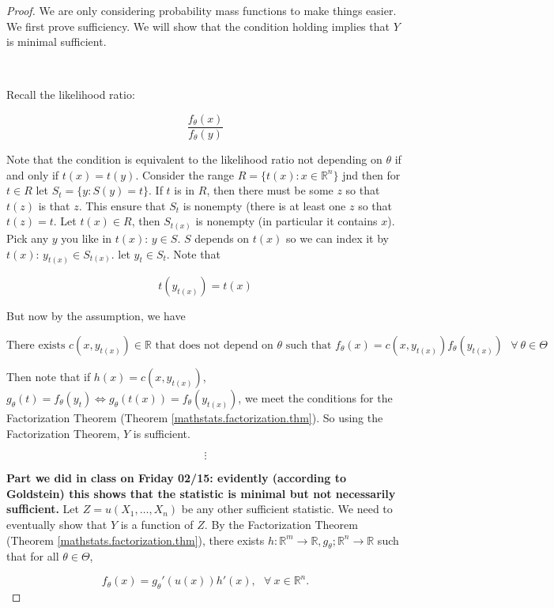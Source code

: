 \begin{proof} We are only considering probability mass functions to make things easier. We first prove sufficiency. We will show that the condition holding implies that \(Y\) is minimal sufficient.

\

Recall the likelihood ratio:

\[
\frac{f_\theta(x)}{f_\theta(y)}
\]

Note that the condition is equivalent to the likelihood ratio not depending on \(\theta\) if and only if \(t(x) = t(y)\). Consider the range \(R=\{t(x): x \in \mathbb{R}^n\}\) jnd then for \(t \in R\) let \(S_t = \{y: S(y)= t\}\). If \(t\) is in \(R\), then there must be some \(z\) so that \(t(z)\) is that \(z\). This ensure that \(S_t\) is nonempty (there is at least one \(z\) so that \(t(z) = t\). Let \(t(x) \in R\), then \(S_{t(x)}\) is nonempty (in particular it contains \(x\)).  Pick any \(y\) you like in \(t(x)\): \(y \in S\). \(S\) depends on \(t(x)\) so we can index it by \(t(x)\): \(y_{t(x)} \in S_{t(x)}\). let \(y_t \in S_t\). Note that 

\[
t(y_{t(x)}) = t(x)
\]

But now by the assumption, we have

\[
\text{There exists } c(x,y_{t(x)}) \in \mathbb{R} \text{ that does not depend on } \theta \text{ such that } f_\theta(x) = c(x,y_{t(x)}) f_\theta(y_{t(x)}) \ \ \ \forall \ \theta \in \Theta 
\]

%

Then note that if \(h(x) =  c(x,y_{t(x)})\), \(g_\theta(t) = f_\theta(y_t) \iff g_\theta(t(x)) =  f_\theta(y_{t(x)})\), we meet the conditions for the Factorization Theorem (Theorem \ref{mathstats.factorization.thm}). So using the Factorization Theorem, \(Y\) is sufficient.

\[
\vdots
\]

\textbf{Part we did in class on Friday 02/15: evidently (according to Goldstein) this shows that the statistic is minimal but not necessarily sufficient.} Let \(Z = u(X_1, \ldots, X_n)\) be any other sufficient statistic. We need to eventually show that \(Y\) is a function of \(Z\). By the Factorization Theorem (Theorem \ref{mathstats.factorization.thm}), there exists \(h: \mathbb{R}^m \to \mathbb{R}, g_\theta; \mathbb{R}^n \to \mathbb{R}\) such that for all \(\theta \in \Theta\), 

\[
f_\theta(x) = g_\theta'(u(x))h'(x), \ \ \ \forall \ x \in \mathbb{R}^n.
\]


\end{proof}
